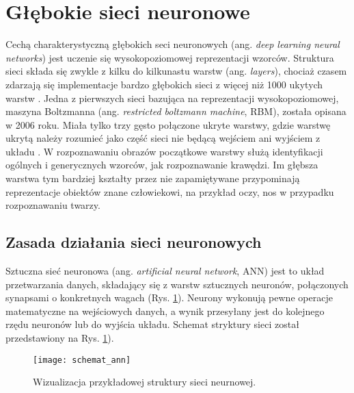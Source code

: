 \section{Głębokie sieci neuronowe}

Cechą charakterystyczną głębokich seci neuronowych (ang. \textit{deep learning neural networks}) jest uczenie się wysokopoziomowej reprezentacji wzorców. Struktura sieci składa się zwykle z kilku do kilkunastu warstw (ang. \textit{layers}), chociaż czasem zdarzają się implementacje bardzo głębokich sieci z więcej niż 1000 ukytych warstw \cite{He2015DeepRL}. Jedna z pierwszych sieci bazująca na reprezentacji wysokopoziomowej, maszyna Boltzmanna (ang. \textit{restricted boltzmann machine}, RBM), została opisana w 2006 roku. Miała tylko trzy gęsto połączone ukryte warstwy, gdzie warstwę ukrytą należy rozumieć jako część sieci nie będącą wejściem ani wyjściem z układu \cite{Hinton2006AFL}. W rozpoznawaniu obrazów początkowe warstwy służą identyfikacji ogólnych i generycznych wzorców, jak rozpoznawanie krawędzi. Im głębsza warstwa tym bardziej kształty przez nie zapamiętywane przypominają reprezentacje obiektów znane człowiekowi, na przykład oczy, nos w przypadku rozpoznawaniu twarzy.

\subsection{Zasada działania sieci neuronowych}
Sztuczna sieć neuronowa (ang. \textit{artificial neural network}, ANN) jest to układ przetwarzania danych, składający się z warstw sztucznych neuronów, połączonych synapsami o konkretnych wagach (Rys. \ref{fig:ann_visualisation}). Neurony wykonują pewne operacje matematyczne na wejściowych danych, a wynik przesyłany jest do kolejnego rzędu neuronów lub do wyjścia układu. Schemat stryktury sieci został przedstawiony na Rys. \ref{fig:ann_visualisation}).

\begin{figure}[h]
	\centering
	\centering
		\texttt{[image: schemat\_ann]}	
	\caption{Wizualizacja przykładowej struktury sieci neurnowej.}
	\label{fig:ann_visualisation}
\end{figure}

